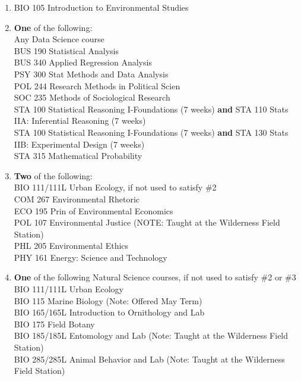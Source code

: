 \documentclass[
  letterpaper,
]{scrbook}
\providecommand{\tightlist}{%
  \setlength{\itemsep}{0pt}\setlength{\parskip}{0pt}}
\begin{document}
\begin{enumerate}
\def\labelenumi{\arabic{enumi}.}
\tightlist
\item
  BIO 105 Introduction to Environmental Studies\\
\item
  \textbf{One} of the following:\\
  Any Data Science course\\
  BUS 190 Statistical Analysis\\
  BUS 340 Applied Regression Analysis\\
  PSY 300 Stat Methods and Data Analysis\\
  POL 244 Research Methods in Political Scien\\
  SOC 235 Methods of Sociological Research\\
  STA 100 Statistical Reasoning I-Foundations (7 weeks) \textbf{and} STA
  110 Stats IIA: Inferential Reasoning (7 weeks)\\
  STA 100 Statistical Reasoning I-Foundations (7 weeks) \textbf{and} STA
  130 Stats IIB: Experimental Design (7 weeks)\\
  STA 315 Mathematical Probability\\
\item
  \textbf{Two} of the following:\\
  BIO 111/111L Urban Ecology, if not used to satisfy \#2\\
  COM 267 Environmental Rhetoric\\
  ECO 195 Prin of Environmental Economics\\
  POL 107 Environmental Justice (NOTE: Taught at the Wilderness Field
  Station)\\
  PHL 205 Environmental Ethics\\
  PHY 161 Energy: Science and Technology\\
\item
  \textbf{One} of the following Natural Science courses, if not used to
  satisfy \#2 or \#3\\
  BIO 111/111L Urban Ecology\\
  BIO 115 Marine Biology (Note: Offered May Term)\\
  BIO 165/165L Introduction to Ornithology and Lab\\
  BIO 175 Field Botany\\
  BIO 185/185L Entomology and Lab (Note: Taught at the Wilderness Field
  Station)\\
  BIO 285/285L Animal Behavior and Lab (Note: Taught at the Wilderness
  Field Station)\\

\end{enumerate}
\end{document}
